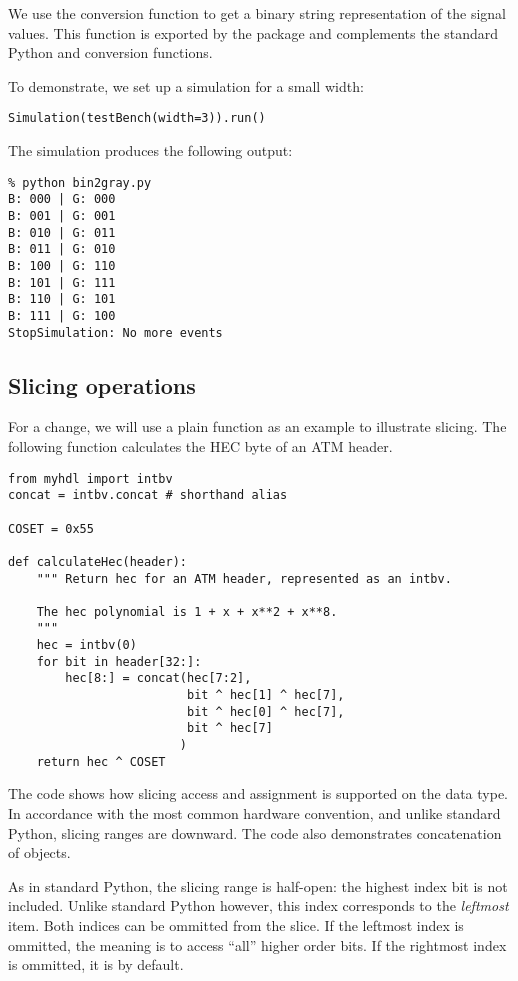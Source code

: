 We use the conversion function  to get a binary
string representation of the signal values. This function is exported
by the  package and complements the standard Python
 and  conversion functions.

To demonstrate, we set up a simulation for a small width: 

\begin{verbatim}
Simulation(testBench(width=3)).run()
\end{verbatim}

The simulation produces the following output:

\begin{verbatim}
% python bin2gray.py
B: 000 | G: 000
B: 001 | G: 001
B: 010 | G: 011
B: 011 | G: 010
B: 100 | G: 110
B: 101 | G: 111
B: 110 | G: 101
B: 111 | G: 100
StopSimulation: No more events
\end{verbatim}

\subsection{Slicing operations \label{intro-slicing}}

For a change, we will use a plain function as an example to illustrate
slicing.  The following function calculates the HEC byte of an ATM
header.

\begin{verbatim}
from myhdl import intbv
concat = intbv.concat # shorthand alias

COSET = 0x55

def calculateHec(header):
    """ Return hec for an ATM header, represented as an intbv.

    The hec polynomial is 1 + x + x**2 + x**8.
    """
    hec = intbv(0)
    for bit in header[32:]:
        hec[8:] = concat(hec[7:2],
                         bit ^ hec[1] ^ hec[7],
                         bit ^ hec[0] ^ hec[7],
                         bit ^ hec[7]
                        )
    return hec ^ COSET
\end{verbatim}

The code shows how slicing access and assignment is supported on the
 data type. In accordance with the most common hardware
convention, and unlike standard Python, slicing ranges are
downward. The code also demonstrates concatenation of 
objects.

As in standard Python, the slicing range is half-open: the highest
index bit is not included. Unlike standard Python however, this index
corresponds to the \emph{leftmost} item. Both indices can be ommitted
from the slice. If the leftmost index is ommitted, the meaning is to
access ``all'' higher order bits.  If the rightmost index is ommitted,
it is  by default.

